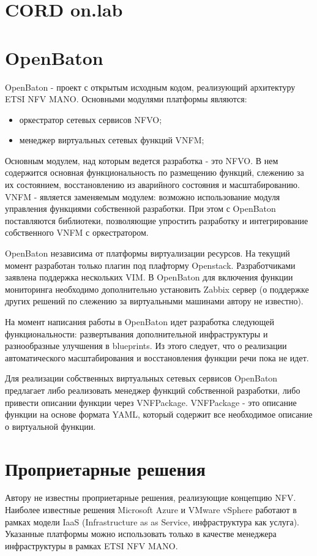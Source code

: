 \documentclass[oneside,final,14pt,a4paper]{extreport}
\begin{document}
\section{CORD on.lab}


\section{OpenBaton}
OpenBaton - проект с открытым исходным кодом, реализующий архитектуру ETSI NFV MANO. Основными модулями платформы являются:
\begin{itemize}
	\item оркестратор сетевых сервисов NFVO;
	\item менеджер виртуальных сетевых функций VNFM;
\end{itemize}

Основным модулем, над которым ведется разработка - это NFVO. В нем содержится основная функциональность по размещению функций, слежению за их состоянием, восстановлению из аварийного состояния и масштабированию. VNFM - является заменяемым модулем: возможно использование модуля управления функциями собственной разработки. При этом с OpenBaton поставляются библиотеки, позволяющие упростить разработку и интегрирование собственного VNFM с оркестратором.

OpenBaton независима от платформы виртуализации ресурсов. На текущий момент разработан только плагин под плафторму Openstack. Разработчиками заявлена поддержка нескольких VIM. В OpenBaton для включения функции мониторинга необходимо дополнительно установить Zabbix сервер (о поддержке других решений по слежению за виртуальными машинами автору не известно).

На момент написания работы в OpenBaton идет разработка следующей функциональности: развертывания дополнительной инфраструктуры и разнообразные улучшения в blueprints. Из этого следует, что о реализации автоматического масштабирования и восстановления функции речи пока не идет.

Для реализации собственных виртуальных сетевых сервисов OpenBaton предлагает либо реализовать менеджер функций собственной разработки, либо привести описании функции через VNFPackage. VNFPackage - это описание функции на основе формата YAML, который содержит все необходимое описание о виртуальной функции.


\section{Проприетарные решения}
Автору не известны проприетарные решения, реализующие концепцию NFV. Наиболее известные решения Microsoft Azure и VMware vSphere работают в рамках модели IaaS (Infrastructure as as Service, инфраструктура как услуга). Указанные платформы можно использовать только в качестве менеджера инфраструктуры в рамках ETSI NFV MANO.
\end{document}
